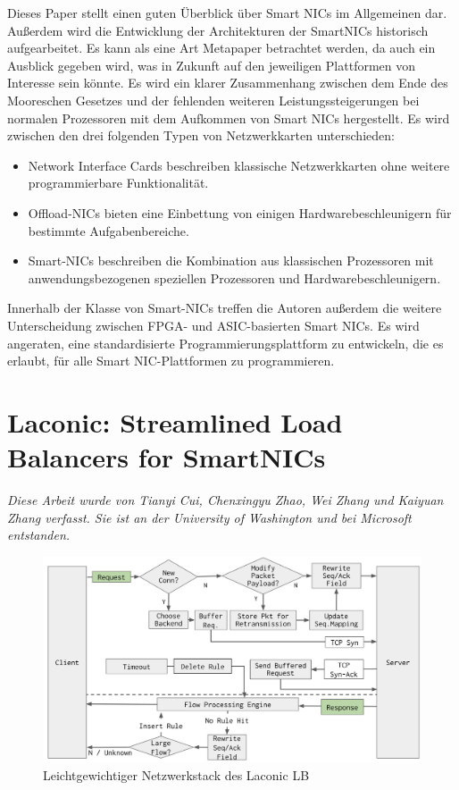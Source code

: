 Dieses Paper stellt einen guten Überblick über Smart NICs im Allgemeinen dar. Außerdem wird die Entwicklung der Architekturen der SmartNICs historisch aufgearbeitet. Es kann als eine Art Metapaper betrachtet werden, da auch ein Ausblick gegeben wird, was in Zukunft auf den jeweiligen Plattformen von Interesse sein könnte. Es wird ein klarer Zusammenhang zwischen dem Ende des Mooreschen Gesetzes und der fehlenden weiteren Leistungssteigerungen bei normalen Prozessoren mit dem Aufkommen von Smart NICs hergestellt. Es wird zwischen den drei folgenden Typen von Netzwerkkarten unterschieden:
\begin{itemize}
    \item Network Interface Cards beschreiben klassische Netzwerkkarten ohne weitere programmierbare Funktionalität.
    \item Offload-NICs bieten eine Einbettung von einigen Hardwarebeschleunigern für bestimmte Aufgabenbereiche.
    \item Smart-NICs beschreiben die Kombination aus klassischen Prozessoren mit anwendungsbezogenen speziellen Prozessoren und Hardwarebeschleunigern.
\end{itemize}
Innerhalb der Klasse von Smart-NICs treffen die Autoren außerdem die weitere Unterscheidung zwischen FPGA- und ASIC-basierten Smart NICs. Es wird angeraten, eine standardisierte Programmierungsplattform zu entwickeln, die es erlaubt, für alle Smart NIC-Plattformen zu programmieren.
\section{Laconic: Streamlined Load Balancers for SmartNICs}
\textit{Diese Arbeit wurde von Tianyi Cui, Chenxingyu Zhao, Wei Zhang und Kaiyuan Zhang  verfasst. Sie ist an der University of Washington und bei Microsoft entstanden.}
\begin{figure}
    \centering
    \includegraphics[width=1\linewidth]{images/laconic_workflow_v1.png}
    \caption{Leichtgewichtiger Netzwerkstack des Laconic LB}
    \label{fig:enter-label}
\end{figure}

